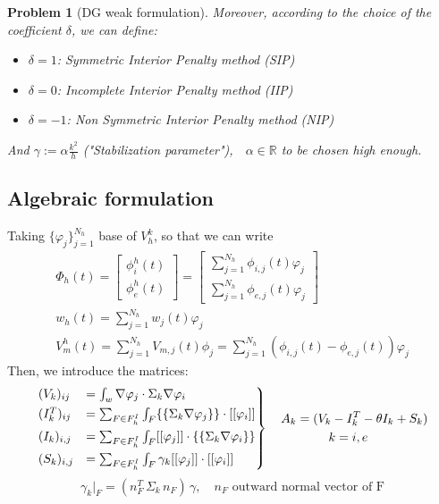 \documentclass[a4paper,11pt]{article}
\newtheorem{problem}{Problem}
\begin{document}
\begin{problem}[DG weak formulation]
    \noindent Moreover, according to the choice of the coefficient $\delta$, we can define:
    \begin{itemize}
    \item $\delta=1$: Symmetric Interior Penalty method (SIP)
    \item $\delta=0$: Incomplete Interior Penalty method (IIP)
    \item $\delta=-1$: Non Symmetric Interior Penalty method (NIP) 
    \end{itemize}
     \vspace{2mm}
    \noindent And $\gamma := \alpha \frac{k^2}{h}$ ("Stabilization parameter"),$ \quad \alpha \in \mathbb{R}$ to be chosen high enough.
    \end{problem}

    \vspace{4mm}
    \subsection{Algebraic formulation}
    Taking $\{\varphi_j\}_{j=1}^{N_h}$ base of $V_h^k$, so that we can write
    \begin{equation*}
    \begin{gathered}
    \Phi_h(t) = \begin{bmatrix} \phi_i^h(t) \\ \phi_e^h(t) \end{bmatrix} = \begin {bmatrix}\sum_{j=1}^{N_h} \phi_{i,j}(t)\varphi_j \\ \sum_{j=1}^{N_h} \phi_{e,j}(t)\varphi_j \end{bmatrix}\\
    w_h(t) = \sum_{j=1}^{N_h}w_j(t)\varphi_j\\
    V_m^h(t)=\sum_{j=1}^{N_h} V_{m,j}(t) \phi_j=\sum_{j=1}^{N_h}(\phi_{i,j}(t)-\phi_{e,j}(t))\varphi_j
 \end{gathered}
 \end{equation*}
 Then, we introduce the matrices:
 \begin{equation}\label{matrices}
\begin{rcases}
(V_k)_{ij} &= \int_{w}\nabla\varphi_j \cdot \Sigma_k \nabla \varphi_i 
\\ (I_k^T)_{ij} &= \sum_{F \in F_h^I} \int_{F} \{\{\Sigma_k \nabla\varphi_j\}\} \cdot [[\varphi_i]] 
\\ (I_k)_{i,j} &= \sum_{F \in F_h^I} \int_{F} [[\varphi_j]] \cdot \{\{\Sigma_k \nabla \varphi_i\}\}
\\(S_k)_{i,j} &= \sum_{F \in F_h^I} \int_{F} \gamma_k[[\varphi_j]] \cdot [[\varphi_i]]
\end{rcases}
\begin{gathered}
\quad A_k = (V_k -I_k^T - \theta I_k + S_k)\\
k=i,e \\
\end{gathered}
\end{equation}
\begin{equation*}
\gamma_k\vert_F = (n_F^T \, \Sigma_k \, n_F) \,\gamma, \quad n_F \text{ outward normal vector of F}
\end{equation*}
\end{document}

